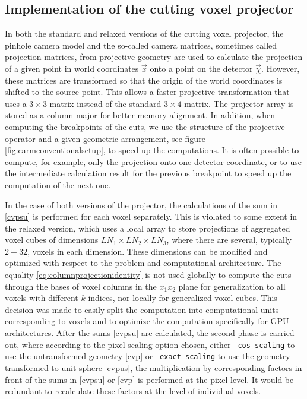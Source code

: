\subsection{Implementation of the cutting voxel projector}
\label{sec:implementation}
In both the standard and relaxed versions of the cutting voxel projector, the pinhole camera model and the so-called camera matrices, sometimes called projection matrices, from projective geometry are used to calculate the projection of a given point in world coordinates $\vec{x}$ onto a point on the detector $\vec{\chi}$. However, these matrices are transformed so that the origin of the world coordinates is shifted to the source point. This allows a faster projective transformation that uses a $3 \times 3$ matrix instead of the standard $3 \times 4$ matrix. The projector array is stored as a column major for better memory alignment. In addition, when computing the breakpoints of the cuts, we use the structure of the projective operator and a given geometric arrangement, see figure \ref{fig:carmconventionalsetup}, to speed up the computations. It is often possible to compute, for example, only the projection onto one detector coordinate, or to use the intermediate calculation result for the previous breakpoint to speed up the computation of the next one.

In the case of both versions of the projector, the calculations of the sum in \eqref{cvpsu} is performed for each voxel separately. This is violated to some extent in the relaxed version, which uses a local array to store projections of aggregated voxel cubes of dimensions $LN_1 \times LN_2 \times LN_3$, where there are several, typically $2-32$, voxels in each dimension. These dimensions can be modified and optimized with respect to the problem and computational architecture. The equality \eqref{eq:columnprojectionidentity} is not used globally to compute the cuts through the bases of voxel columns in the $x_1 x_2$ plane for generalization to all voxels with different $k$ indices, nor locally for generalized voxel cubes. This decision was made to easily split the computation into computational units corresponding to voxels and to optimize the computation specifically for GPU architectures. After the sums \eqref{cvpsu} are calculated, the second phase is carried out, where according to the pixel scaling option chosen, either \texttt{--cos-scaling} to use the untransformed geometry \eqref{cvp} or \texttt{--exact-scaling} to use the geometry transformed to unit sphere \eqref{cvpus}, the multiplication by corresponding factors in front of the sums in \eqref{cvpsu} or \eqref{cvp} is performed at the pixel level. It would be redundant to recalculate these factors at the level of individual voxels.

